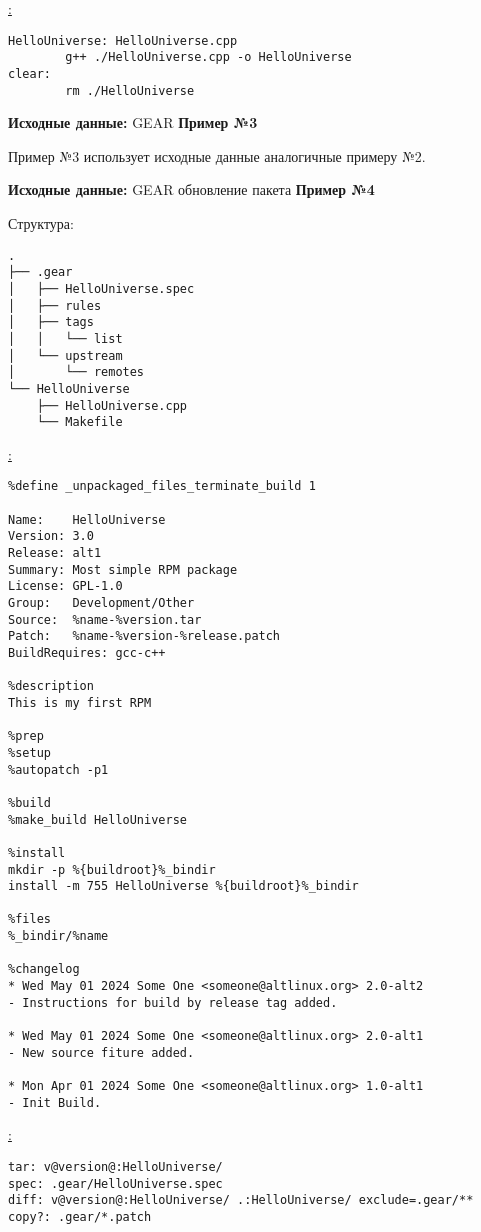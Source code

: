 \noindent\underline{:}
\begin{verbatim}
HelloUniverse: HelloUniverse.cpp
        g++ ./HelloUniverse.cpp -o HelloUniverse
clear:
        rm ./HelloUniverse

\end{verbatim}

\textbf{Исходные данные:} GEAR \textbf{Пример №3}

\noindent
Пример №3  использует исходные данные аналогичные примеру №2.\\
\par
\textbf{Исходные данные:} GEAR обновление пакета \textbf{Пример №4}

\noindent Структура:
\begin{verbatim}
.
├── .gear
│   ├── HelloUniverse.spec
│   ├── rules
│   ├── tags
│   │   └── list
│   └── upstream
│       └── remotes
└── HelloUniverse
    ├── HelloUniverse.cpp
    └── Makefile

\end{verbatim}

\noindent\underline{:}
\begin{verbatim}
%define _unpackaged_files_terminate_build 1

Name:    HelloUniverse
Version: 3.0
Release: alt1
Summary: Most simple RPM package
License: GPL-1.0
Group:   Development/Other
Source:  %name-%version.tar
Patch:   %name-%version-%release.patch
BuildRequires: gcc-c++

%description
This is my first RPM

%prep
%setup
%autopatch -p1

%build
%make_build HelloUniverse

%install
mkdir -p %{buildroot}%_bindir
install -m 755 HelloUniverse %{buildroot}%_bindir

%files
%_bindir/%name

%changelog
* Wed May 01 2024 Some One <someone@altlinux.org> 2.0-alt2
- Instructions for build by release tag added.

* Wed May 01 2024 Some One <someone@altlinux.org> 2.0-alt1
- New source fiture added.

* Mon Apr 01 2024 Some One <someone@altlinux.org> 1.0-alt1
- Init Build.

\end{verbatim}


\noindent\underline{:}
\begin{verbatim}
tar: v@version@:HelloUniverse/
spec: .gear/HelloUniverse.spec
diff: v@version@:HelloUniverse/ .:HelloUniverse/ exclude=.gear/**
copy?: .gear/*.patch

\end{verbatim}

